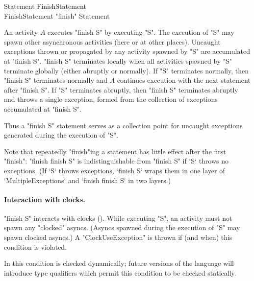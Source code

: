 \begin{grammar}
Statement \: FinishStatement \\
FinishStatement \: \xcd"finish" Statement 
\end{grammar}

An activity $A$ executes \xcd"finish S" by executing \xcd"S".  The
execution of \xcd"S" may spawn other asynchronous activities (here or
at other places).  Uncaught exceptions thrown or propagated by any
activity spawned by \xcd"S" are accumulated at \xcd"finish S".
\xcd"finish S" terminates locally when all activities spawned by
\xcd"S" terminate globally (either abruptly or normally). If \xcd"S"
terminates normally, then \xcd"finish S" terminates normally and $A$
continues execution with the next statement after \xcd"finish S".  If
\xcd"S" terminates abruptly, then \xcd"finish S" terminates abruptly
and throws a single exception, 
formed from the collection of exceptions accumulated at \xcd"finish S".

Thus a \xcd"finish S" statement serves as a collection point for
uncaught exceptions generated during the execution of \xcd"S".

Note that repeatedly \xcd"finish"ing a statement has little effect after
the first \xcd"finish": \xcd"finish finish S" is indistinguishable
from \xcd"finish S" if \xcd`S` throws no exceptions.  (If \xcd`S` throws
exceptions, \xcd`finish S` wraps them in one layer of 
\xcd`MultipleExceptions` and \xcd`finish finish S` in two layers.)

\paragraph{Interaction with clocks.}\label{sec:finish:clock-rule}

\xcd"finish S" interacts with clocks (). 
While executing \xcd"S", an activity must not spawn any \xcd"clocked"
asyncs. (Asyncs spawned during the execution of \xcd"S" may spawn
clocked asyncs.) A
\xcd"ClockUseException" is thrown
if (and when) this condition is violated.

In \XtenCurrVer{} this condition is checked dynamically; future
versions of the language will introduce type qualifiers which permit
this condition to be checked statically.



